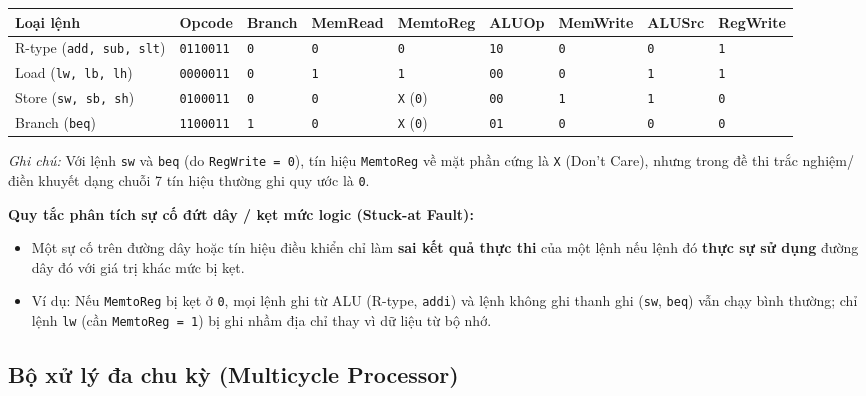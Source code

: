 \begin{tcolorbox}[bwbox, title={Bảng chân trị 7 tín hiệu điều khiển chính (Single-Cycle RISC-V)}]
\begin{center}
\renewcommand{\arraystretch}{1.2}
\small
\begin{tabularx}{\linewidth}{|Y|C{1.7cm}|Z|Z|Z|Z|Z|Z|Z|}
\hline
\textbf{Loại lệnh} & \textbf{Opcode} & \textbf{Branch} & \textbf{MemRead} & \textbf{MemtoReg} & \textbf{ALUOp} & \textbf{MemWrite} & \textbf{ALUSrc} & \textbf{RegWrite} \\ \hline
R-type (\texttt{add, sub, slt}) & \texttt{0110011} & \texttt{0} & \texttt{0} & \texttt{0} & \texttt{10} & \texttt{0} & \texttt{0} & \texttt{1} \\ \hline
Load (\texttt{lw, lb, lh}) & \texttt{0000011} & \texttt{0} & \texttt{1} & \texttt{1} & \texttt{00} & \texttt{0} & \texttt{1} & \texttt{1} \\ \hline
Store (\texttt{sw, sb, sh}) & \texttt{0100011} & \texttt{0} & \texttt{0} & \texttt{X} (\texttt{0}) & \texttt{00} & \texttt{1} & \texttt{1} & \texttt{0} \\ \hline
Branch (\texttt{beq}) & \texttt{1100011} & \texttt{1} & \texttt{0} & \texttt{X} (\texttt{0}) & \texttt{01} & \texttt{0} & \texttt{0} & \texttt{0} \\ \hline
\end{tabularx}
\end{center}
\textit{Ghi chú:} Với lệnh \texttt{sw} và \texttt{beq} (do \texttt{RegWrite = 0}), tín hiệu \texttt{MemtoReg} về mặt phần cứng là \texttt{X} (Don't Care), nhưng trong đề thi trắc nghiệm/điền khuyết dạng chuỗi 7 tín hiệu thường ghi quy ước là \texttt{0}.
\end{tcolorbox}

\textbf{Quy tắc phân tích sự cố đứt dây / kẹt mức logic (Stuck-at Fault):}
\begin{itemize}
    \item Một sự cố trên đường dây hoặc tín hiệu điều khiển chỉ làm \textbf{sai kết quả thực thi} của một lệnh nếu lệnh đó \textbf{thực sự sử dụng} đường dây đó với giá trị khác mức bị kẹt.
    \item Ví dụ: Nếu \texttt{MemtoReg} bị kẹt ở \texttt{0}, mọi lệnh ghi từ ALU (R-type, \texttt{addi}) và lệnh không ghi thanh ghi (\texttt{sw}, \texttt{beq}) vẫn chạy bình thường; chỉ lệnh \texttt{lw} (cần \texttt{MemtoReg = 1}) bị ghi nhầm địa chỉ thay vì dữ liệu từ bộ nhớ.
\end{itemize}

\subsection{Bộ xử lý đa chu kỳ (Multicycle Processor)}

